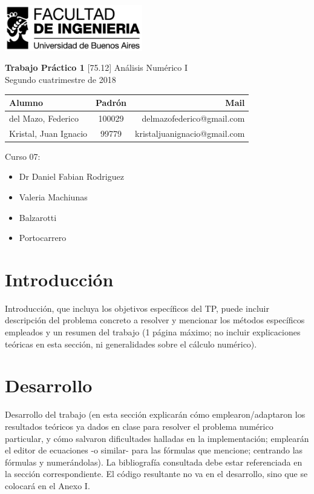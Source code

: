 \documentclass[11pt,a4paper]{article}
\begin{document}
\begin{titlepage}
	\hfill\includegraphics[width=6cm]{fiuba.jpg}
    \begin{center}
    \vfill
    \Huge \textbf{Trabajo Práctico 1}
    \vskip2cm
    \Large [75.12] Análisis Numérico I\\
    Segundo cuatrimestre de 2018
    \vfill
    \begin{tabular}{|l|c|r|}
	\hline
	Alumno & Padrón & Mail\\
	\hline
	\hline
	del Mazo, Federico & 100029 & delmazofederico@gmail.com\\
	\hline
	Kristal, Juan Ignacio & 99779 & kristaljuanignacio@gmail.com\\
	\hline
	\end{tabular}
    \vskip2cm
    \end{center}

    Curso 07:

    \begin{itemize}
    \item Dr Daniel Fabian Rodriguez
    \item Valeria Machiunas
    \item Balzarotti
    \item Portocarrero
    \end{itemize}

\end{titlepage}



\tableofcontents
\thispagestyle{onlyheader}
\newpage


\setcounter{page}{1}

\section{Introducción}
Introducción, que incluya \cite{Wickham} los objetivos específicos del TP, puede incluir descripción del
problema concreto a resolver y mencionar los métodos específicos empleados y un resumen del
trabajo (1 página máximo; no incluir explicaciones teóricas en esta sección, ni generalidades
sobre el cálculo numérico).

\section{Desarrollo}
 Desarrollo del trabajo (en esta sección explicarán cómo emplearon/adaptaron los
resultados teóricos ya dados en clase para resolver el problema numérico particular, y cómo
salvaron dificultades halladas en la implementación; emplearán el editor de ecuaciones -o
similar- para las fórmulas que mencione; centrando las fórmulas y numerándolas). La
bibliografía consultada debe estar referenciada en la sección correspondiente. El código
resultante no va en el desarrollo, sino que se colocará en el Anexo I.
\end{document}
